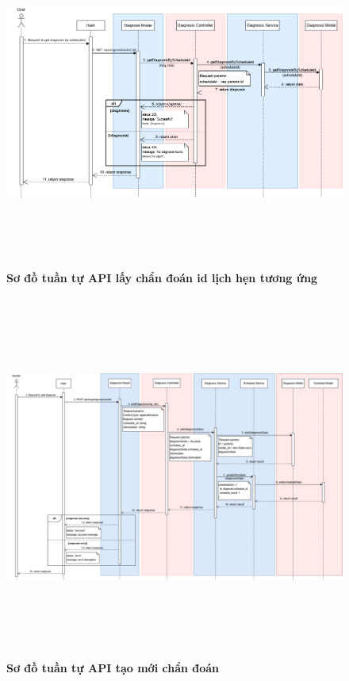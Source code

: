 \begin{figure}[H]
	\centering
	\includegraphics[width=15cm,height=11cm]{Images/api_sequence/diag/getByScheduleId.drawio.png}
	\caption[Sơ đồ tuần tự API lấy chẩn đoán theo id lịch hẹn tương ứng]{\bfseries \fontsize{12pt}{0pt}\selectfont Sơ đồ tuần tự API lấy chẩn đoán id lịch hẹn tương ứng}
	\label{sequence_diagram_get_diagnosis_by_schedule}
\end{figure}

\begin{figure}[H]
	\centering
	\includegraphics[width=15cm,height=12cm]{Images/api_sequence/diag/create.drawio.png}
	\caption[Sơ đồ tuần tự API tạo mới chẩn đoán]{\bfseries \fontsize{12pt}{0pt}\selectfont Sơ đồ tuần tự API tạo mới chẩn đoán}
	\label{sequence_diagram_create_diagnosis}
\end{figure}

